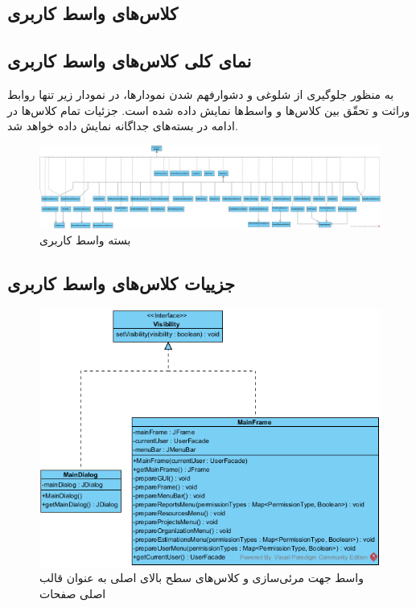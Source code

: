 \begin{landscape}
\section{کلاس‌های واسط کاربری}
\subsection{نمای کلی کلاس‌های واسط کاربری}
به منظور جلوگیری از شلوغی و دشوار‌فهم شدن نمودارها، در نمودار زیر تنها روابط وراثت و تحقّق بین کلاس‌ها و واسط‌ها نمایش داده شده است. جزئیات تمام کلاس‌ها در ادامه در بسته‌های جداگانه نمایش داده خواهد شد.\\
\begin{figure}[H]
	\centering
	\includegraphics[scale=0.30]{img/class-design/ui/FinalUI}
	\caption{بسته واسط کاربری}
\end{figure}
\end{landscape}

\subsection{جزییات کلاس‌های واسط کاربری}
\begin{figure}[H]
	\centering
	\includegraphics[width=\textwidth]{img/class-design/ui/TopClasses.png}

	\caption{واسط جهت مرئی‌سازی و کلاس‌های سطح بالای اصلی به عنوان قالب اصلی صفحات}
\end{figure}

